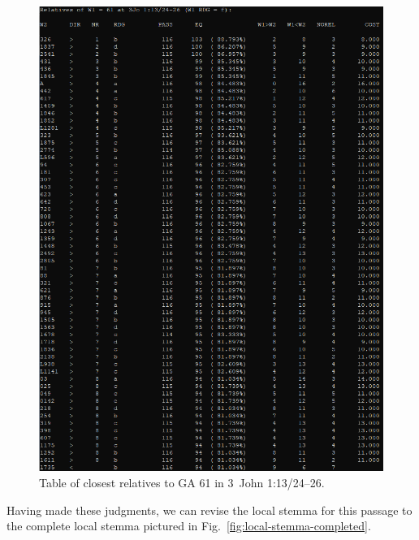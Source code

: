 \documentclass[a4paper, 12pt]{article}
\begin{document}
	\newpage
	
	\begin{figure}[h!]
		\centering
		\includegraphics[width=\textwidth]{../graphics/find-relatives-61-B25K1V13U24-26.png}
		\caption{Table of closest relatives to GA 61 in 3~John 1:13/24–26.}
		\label{fig:find-relatives-61-B25K1V13U24-26}
	\end{figure}
	
	\newpage
	
	Having made these judgments, we can revise the local stemma for this passage to the complete local stemma pictured in Fig.~\ref{fig:local-stemma-completed}.
	
\end{document}

